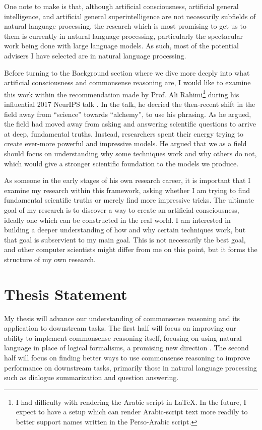 \documentclass[12pt]{report}
\begin{document}
One note to make is that, although artificial consciousness, artificial general intelligence, and artificial general superintelligence are not necessarily subfields of natural language processing, the research which is most promising to get us to them is currently in natural language processing, particularly the spectacular work being done with large language models.
As such, most of the potential advisers I have selected are in natural language processing.

Before turning to the Background section where we dive more deeply into what artificial consciousness and commonsense reasoning are, I would like to examine this work within the recommendation made by Prof. Ali Rahimi\footnote{I had difficulty with rendering the Arabic script in \LaTeX. In the future, I expect to have a setup which can render Arabic-script text more readily to better support names written in the Perso-Arabic script.} during his influential 2017 NeurIPS talk \cite{Rahimi2017-ax}.
In the talk, he decried the then-recent shift in the field away from \enquote{science} towards \enquote{alchemy}, to use his phrasing.
As he argued, the field had moved away from asking and answering scientific questions to arrive at deep, fundamental truths.
Instead, researchers spent their energy trying to create ever-more powerful and impressive models.
He argued that we as a field should focus on understanding why some techniques work and why others do not, which would give a stronger scientific foundation to the models we produce.

As someone in the early stages of his own research career, it is important that I examine my research within this framework, asking whether I am trying to find fundamental scientific truths or merely find more impressive tricks.
The ultimate goal of my research is to discover a way to create an artificial consciousness, ideally one which can be constructed in the real world.
I am interested in building a deeper understanding of how and why certain techniques work, but that goal is subservient to my main goal.
This is not necessarily the best goal, and other computer scientists might differ from me on this point, but it forms the structure of my own research.

\section{Thesis Statement}

My thesis will advance our understanding of commonsense reasoning and its application to downstream tasks.
The first half will focus on improving our ability to implement commonsense reasoning itself, focusing on using natural language in place of logical formalisms, a promising new direction \cite{Choi2022-to}.
The second half will focus on finding better ways to use commonsense reasoning to improve performance on downstream tasks, primarily those in natural language processing such as dialogue summarization and question answering.
\end{document}
